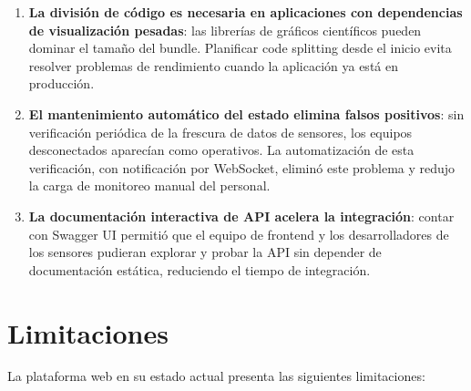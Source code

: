\begin{enumerate}
    \item \textbf{La división de código es necesaria en aplicaciones con
    dependencias de visualización pesadas}: las librerías de gráficos
    científicos pueden dominar el tamaño del bundle. Planificar code splitting
    desde el inicio evita resolver problemas de rendimiento cuando la
    aplicación ya está en producción.

    \item \textbf{El mantenimiento automático del estado elimina falsos
    positivos}: sin verificación periódica de la frescura de datos de
    sensores, los equipos desconectados aparecían como operativos. La
    automatización de esta verificación, con notificación por WebSocket,
    eliminó este problema y redujo la carga de monitoreo manual del personal.

    \item \textbf{La documentación interactiva de API acelera la integración}:
    contar con Swagger UI permitió que el equipo de frontend y los
    desarrolladores de los sensores pudieran explorar y probar la API sin
    depender de documentación estática, reduciendo el tiempo de integración.
\end{enumerate}

\section{Limitaciones}

La plataforma web en su estado actual presenta las siguientes limitaciones:

